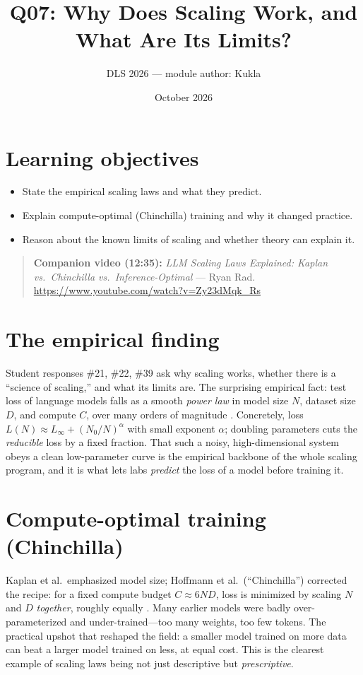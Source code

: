 \documentclass[11pt]{article}
\title{Q07: Why Does Scaling Work, and What Are Its Limits?}
\author{DLS 2026 --- module author: Kukla}
\date{October 2026}
\begin{document}
\maketitle

\section*{Learning objectives}
\begin{itemize}[leftmargin=1.4em]
\item State the empirical scaling laws and what they predict.
\item Explain compute-optimal (Chinchilla) training and why it changed practice.
\item Reason about the known limits of scaling and whether theory can explain it.
\end{itemize}

\begin{quote}\small\textbf{Companion video (12:35):} \emph{LLM Scaling Laws Explained: Kaplan vs.\ Chinchilla vs.\ Inference-Optimal} --- Ryan Rad.\\ \url{https://www.youtube.com/watch?v=Zy23dMqk_Rs}\end{quote}

\section{The empirical finding}
Student responses \#21, \#22, \#39 ask why scaling works, whether there is a ``science of scaling,'' and
what its limits are. The surprising empirical fact: test loss of language models falls as a smooth
\emph{power law} in model size $N$, dataset size $D$, and compute $C$, over many orders of magnitude
\citep{kaplan2020scaling}. Concretely, loss $L(N) \approx L_\infty + (N_0/N)^{\alpha}$ with small
exponent $\alpha$; doubling parameters cuts the \emph{reducible} loss by a fixed fraction. That such a
noisy, high-dimensional system obeys a clean low-parameter curve is the empirical backbone of the whole
scaling program, and it is what lets labs \emph{predict} the loss of a model before training it.

\section{Compute-optimal training (Chinchilla)}
Kaplan et al.\ emphasized model size; Hoffmann et al.\ (``Chinchilla'') corrected the recipe: for a fixed
compute budget $C \approx 6ND$, loss is minimized by scaling $N$ and $D$ \emph{together}, roughly
equally \citep{hoffmann2022chinchilla}. Many earlier models were badly over-parameterized and
under-trained---too many weights, too few tokens. The practical upshot that reshaped the field: a smaller
model trained on more data can beat a larger model trained on less, at equal cost. This is the clearest
example of scaling laws being not just descriptive but \emph{prescriptive}.
\end{document}
